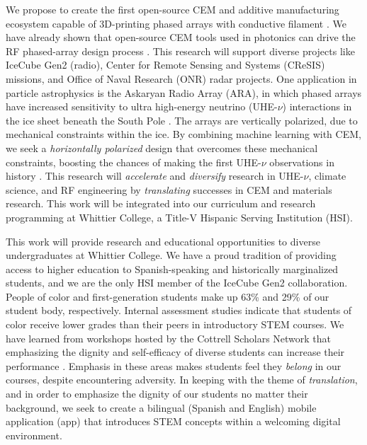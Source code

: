 \documentclass[../../main.tex]{subfiles}
\begin{document}
We propose to create the first open-source CEM and additive manufacturing ecosystem capable of 3D-printing phased arrays with conductive filament \cite{10.3390/electronics8121506, yurduseven,8786183}.  We have already shown that open-source CEM tools used in photonics can drive the RF phased-array design process \cite{electronics10040415,meepcon2022,10.1016/j.cpc.2009.11.008}.  This research will support diverse projects like IceCube Gen2 (radio), Center for Remote Sensing and Systems (CReSIS) missions, and Office of Naval Research (ONR) radar projects.  One application in particle astrophysics is the Askaryan Radio Array (ARA), in which phased arrays have increased sensitivity to ultra high-energy neutrino (UHE-$\nu$) interactions in the ice sheet beneath the South Pole \cite{PhysRevD.105.122006}.  The arrays are vertically polarized, due to mechanical constraints within the ice.  By combining machine learning with CEM, we seek a \textit{horizontally polarized} design that overcomes these mechanical constraints, boosting the chances of making the first UHE-$\nu$ observations in history \cite{10.1088/1748-0221/15/09/p09039}.  This research will \textit{accelerate} and \textit{diversify} research in UHE-$\nu$, climate science, and RF engineering by \textit{translating} successes in CEM and materials research.  This work will be integrated into our curriculum and research programming at Whittier College, a Title-V Hispanic Serving Institution (HSI).  \\ \vspace{2.5mm}

This work will provide research and educational opportunities to diverse undergraduates at Whittier College.  We have a proud tradition of providing access to higher education to Spanish-speaking and historically marginalized students, and we are the only HSI member of the IceCube Gen2 collaboration.  People of color and first-generation students make up 63\% and 29\% of our student body, respectively.  Internal assessment studies indicate that students of color receive lower grades than their peers in introductory STEM courses.  We have learned from workshops hosted by the Cottrell Scholars Network that emphasizing the dignity and self-efficacy of diverse students can increase their performance \cite{cottrell1,cottrell2}.  Emphasis in these areas makes students feel they \textit{belong} in our courses, despite encountering adversity. In keeping with the theme of \textit{translation}, and in order to emphasize the dignity of our students no matter their background, we seek to create a bilingual (Spanish and English) mobile application (app) that introduces STEM concepts within a welcoming digital environment. \\ \vspace{2.5mm}
\end{document}
